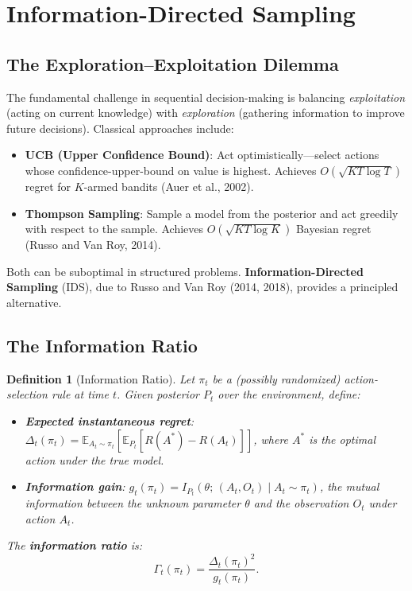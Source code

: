 \documentclass[11pt,a4paper]{article}
\newtheorem{definition}[theorem]{Definition}
\newcommand{\E}{\mathbb{E}}
\begin{document}
\section{Information-Directed Sampling}
\label{sec:ids}

\subsection{The Exploration--Exploitation Dilemma}

The fundamental challenge in sequential decision-making is balancing
\emph{exploitation} (acting on current knowledge) with \emph{exploration}
(gathering information to improve future decisions). Classical approaches include:

\begin{itemize}[nosep]
  \item \textbf{UCB (Upper Confidence Bound)}: Act optimistically---select actions whose
    confidence-upper-bound on value is highest. Achieves $O(\sqrt{KT \log T})$
    regret for $K$-armed bandits (Auer et al., 2002).
  \item \textbf{Thompson Sampling}: Sample a model from the posterior and act
    greedily with respect to the sample. Achieves $O(\sqrt{KT \log K})$
    Bayesian regret (Russo and Van Roy, 2014).
\end{itemize}

Both can be suboptimal in structured problems. \textbf{Information-Directed Sampling}
(IDS), due to Russo and Van Roy (2014, 2018), provides a principled alternative.

\subsection{The Information Ratio}

\begin{definition}[Information Ratio]
Let $\pi_t$ be a (possibly randomized) action-selection rule at time $t$.
Given posterior $P_t$ over the environment, define:
\begin{itemize}[nosep]
  \item \textbf{Expected instantaneous regret}: $\Delta_t(\pi_t) = \E_{A_t \sim \pi_t}[\E_{P_t}[R(A^*) - R(A_t)]]$,
    where $A^*$ is the optimal action under the true model.
  \item \textbf{Information gain}: $g_t(\pi_t) = I_{P_t}(\theta;\, (A_t, O_t) \mid A_t \sim \pi_t)$,
    the mutual information between the unknown parameter $\theta$ and the
    observation $O_t$ under action $A_t$.
\end{itemize}
The \textbf{information ratio} is:
\begin{equation}
  \Gamma_t(\pi_t) = \frac{\Delta_t(\pi_t)^2}{g_t(\pi_t)}. \label{eq:info-ratio}
\end{equation}
\end{definition}
\end{document}
